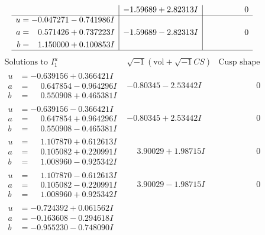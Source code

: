 \documentclass[1p]{elsarticle_modified}
\theoremstyle{definition}
\newcommand{\I}{\sqrt{-1}}
\begin{document}
$$\begin{array}{c|c|c}
 & -1.59689 + 2.82313 I & \phantom{-0.000000 } 0 \\ \hline\begin{aligned}
u &= -0.047271 - 0.741986 I \\
a &= \phantom{-}0.571426 + 0.737223 I \\
b &= \phantom{-}1.150000 + 0.100853 I\end{aligned}
 & -1.59689 - 2.82313 I & \phantom{-0.000000 } 0\\
 \hline 
 \end{array}$$\newpage$$\begin{array}{c|c|c}  
\text{Solutions to }I^u_{1}& \I (\text{vol} + \sqrt{-1}CS) & \text{Cusp shape}\\
 \hline 
\begin{aligned}
u &= -0.639156 + 0.366421 I \\
a &= \phantom{-}0.647854 - 0.964296 I \\
b &= \phantom{-}0.550908 + 0.465381 I\end{aligned}
 & -0.80345 - 2.53442 I & \phantom{-0.000000 } 0 \\ \hline\begin{aligned}
u &= -0.639156 - 0.366421 I \\
a &= \phantom{-}0.647854 + 0.964296 I \\
b &= \phantom{-}0.550908 - 0.465381 I\end{aligned}
 & -0.80345 + 2.53442 I & \phantom{-0.000000 } 0 \\ \hline\begin{aligned}
u &= \phantom{-}1.107870 + 0.612613 I \\
a &= \phantom{-}0.105082 + 0.220991 I \\
b &= \phantom{-}1.008960 - 0.925342 I\end{aligned}
 & \phantom{-}3.90029 + 1.98715 I & \phantom{-0.000000 } 0 \\ \hline\begin{aligned}
u &= \phantom{-}1.107870 - 0.612613 I \\
a &= \phantom{-}0.105082 - 0.220991 I \\
b &= \phantom{-}1.008960 + 0.925342 I\end{aligned}
 & \phantom{-}3.90029 - 1.98715 I & \phantom{-0.000000 } 0 \\ \hline\begin{aligned}
u &= -0.724392 + 0.061562 I \\
a &= -0.163608 - 0.294618 I \\
b &= -0.955230 - 0.748090 I\end{aligned}

\end{array}$$
\end{document}
